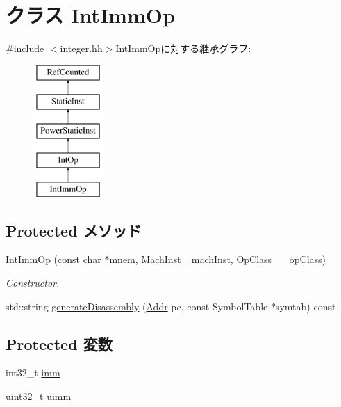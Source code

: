 \hypertarget{classPowerISA_1_1IntImmOp}{
\section{クラス IntImmOp}
\label{classPowerISA_1_1IntImmOp}
}


{\ttfamily \#include $<$integer.hh$>$}IntImmOpに対する継承グラフ:\begin{figure}[H]
\begin{center}
\leavevmode
\includegraphics[height=5cm]{classPowerISA_1_1IntImmOp}
\end{center}
\end{figure}
\subsection*{Protected メソッド}
\begin{DoxyCompactItemize}
\item 
\hyperlink{classPowerISA_1_1IntImmOp_a75dfd9dcc9e2dad140bc74dce308a2c3}{IntImmOp} (const char $\ast$mnem, \hyperlink{namespacePowerISA_a301c22ea09fa33dcfe6ddf22f203699c}{MachInst} \_\-machInst, OpClass \_\-\_\-opClass)
\begin{DoxyCompactList}\small\item\em Constructor. \item\end{DoxyCompactList}\item 
std::string \hyperlink{classPowerISA_1_1IntImmOp_a3134956ec18bb095818e06eb988f6c55}{generateDisassembly} (\hyperlink{base_2types_8hh_af1bb03d6a4ee096394a6749f0a169232}{Addr} pc, const SymbolTable $\ast$symtab) const 
\end{DoxyCompactItemize}
\subsection*{Protected 変数}
\begin{DoxyCompactItemize}
\item 
int32\_\-t \hyperlink{classPowerISA_1_1IntImmOp_a71f011dbd3228d41f9e08aaf8c133f77}{imm}
\item 
\hyperlink{Type_8hh_a435d1572bf3f880d55459d9805097f62}{uint32\_\-t} \hyperlink{classPowerISA_1_1IntImmOp_a3d3bf1a8a03d0ccb5d3bd879613af6d3}{uimm}
\end{DoxyCompactItemize}


